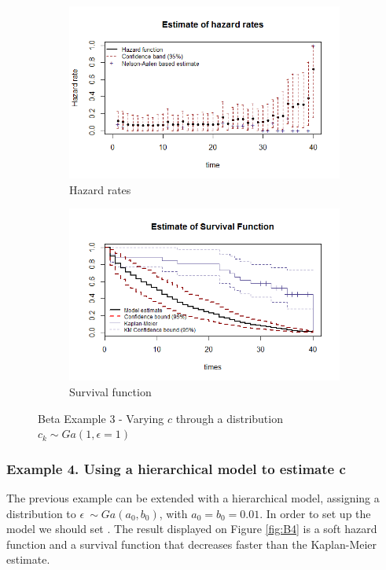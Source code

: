 \documentclass[letterpaper]{article}\usepackage[]{graphicx}\usepackage[]{xcolor}
\begin{document}
\begin{figure}
  \centering
  \begin{subfigure}[a]{\textwidth}\centering
    \includegraphics[width=\textwidth]{B31.png}
    \caption{Hazard rates}
  \end{subfigure}
  \begin{subfigure}[b]{\textwidth}\centering
    \includegraphics[width=\textwidth]{B32.png}
    \caption{Survival function}
  \end{subfigure}
  \caption{Beta Example 3 - Varying $c$ through a distribution $c_k\sim Ga(1,\epsilon = 1)$}
  \label{fig:B3}
\end{figure}

\subsubsection{Example 4. Using a hierarchical model to estimate c}

The previous example can be extended with a hierarchical model, assigning a distribution to $\epsilon ~ \sim Ga(a_0,b_0)$, with $a_0=b_0=0.01$. In order to set up the model we should set . The result displayed on Figure \ref{fig:B4} is a soft hazard function and a survival function that decreases faster than the Kaplan-Meier estimate.
\end{document}
